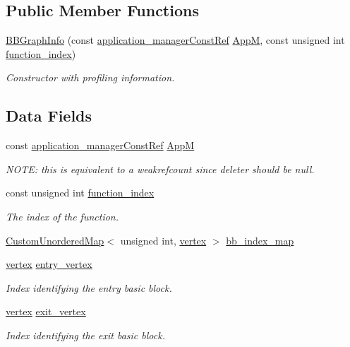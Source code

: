 \subsection*{Public Member Functions}
\begin{DoxyCompactItemize}
\item 
\hyperlink{structBBGraphInfo_a71fb8bf6a9de3af8df20fb93b5fe62d2}{B\+B\+Graph\+Info} (const \hyperlink{application__manager_8hpp_abb985163a2a3fb747f6f03b1eaadbb44}{application\+\_\+manager\+Const\+Ref} \hyperlink{structBBGraphInfo_aa4cba6c688559e4173cfd8e00133684c}{AppM}, const unsigned int \hyperlink{structBBGraphInfo_a3ffe0930d57fc4eda012d102d6594b00}{function\+\_\+index})
\begin{DoxyCompactList}\small\item\em Constructor with profiling information. \end{DoxyCompactList}\end{DoxyCompactItemize}
\subsection*{Data Fields}
\begin{DoxyCompactItemize}
\item 
const \hyperlink{application__manager_8hpp_abb985163a2a3fb747f6f03b1eaadbb44}{application\+\_\+manager\+Const\+Ref} \hyperlink{structBBGraphInfo_aa4cba6c688559e4173cfd8e00133684c}{AppM}
\begin{DoxyCompactList}\small\item\em N\+O\+TE\+: this is equivalent to a weakrefcount since deleter should be null. \end{DoxyCompactList}\item 
const unsigned int \hyperlink{structBBGraphInfo_a3ffe0930d57fc4eda012d102d6594b00}{function\+\_\+index}
\begin{DoxyCompactList}\small\item\em The index of the function. \end{DoxyCompactList}\item 
\hyperlink{custom__map_8hpp_ad1ed68f2ff093683ab1a33522b144adc}{Custom\+Unordered\+Map}$<$ unsigned int, \hyperlink{graph_8hpp_abefdcf0544e601805af44eca032cca14}{vertex} $>$ \hyperlink{structBBGraphInfo_a4685ad9ee2ceee9d5e88ff1272fcf870}{bb\+\_\+index\+\_\+map}
\item 
\hyperlink{graph_8hpp_abefdcf0544e601805af44eca032cca14}{vertex} \hyperlink{structBBGraphInfo_a10d172f321a87de12a5cd425f37a585b}{entry\+\_\+vertex}
\begin{DoxyCompactList}\small\item\em Index identifying the entry basic block. \end{DoxyCompactList}\item 
\hyperlink{graph_8hpp_abefdcf0544e601805af44eca032cca14}{vertex} \hyperlink{structBBGraphInfo_a51063a00b38624c4c1ddcb0226fa1e0c}{exit\+\_\+vertex}
\begin{DoxyCompactList}\small\item\em Index identifying the exit basic block. \end{DoxyCompactList}\end{DoxyCompactItemize}


